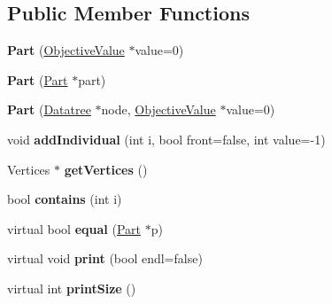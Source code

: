 \subsection*{Public Member Functions}
\begin{DoxyCompactItemize}
\item 
\hypertarget{classPart_a529e3046eef59e036be4a28293e1d696}{{\bfseries Part} (\hyperlink{classObjectiveValue}{Objective\-Value} $\ast$value=0)}\label{classPart_a529e3046eef59e036be4a28293e1d696}

\item 
\hypertarget{classPart_a4fc5eedff4d310041e3ebee54693f4ac}{{\bfseries Part} (\hyperlink{classPart}{Part} $\ast$part)}\label{classPart_a4fc5eedff4d310041e3ebee54693f4ac}

\item 
\hypertarget{classPart_abbe62c3accdcc1234035cd8149b540f0}{{\bfseries Part} (\hyperlink{classDatatree}{Datatree} $\ast$node, \hyperlink{classObjectiveValue}{Objective\-Value} $\ast$value=0)}\label{classPart_abbe62c3accdcc1234035cd8149b540f0}

\item 
\hypertarget{classPart_a4f5392674db4c546b35c5a87dec8d204}{void {\bfseries add\-Individual} (int i, bool front=false, int value=-\/1)}\label{classPart_a4f5392674db4c546b35c5a87dec8d204}

\item 
\hypertarget{classPart_aa5a500dd200b320ffd3a51868cc79fb0}{Vertices $\ast$ {\bfseries get\-Vertices} ()}\label{classPart_aa5a500dd200b320ffd3a51868cc79fb0}

\item 
\hypertarget{classPart_aad63cc5e3df656d4b847a6ad948dbf3d}{bool {\bfseries contains} (int i)}\label{classPart_aad63cc5e3df656d4b847a6ad948dbf3d}

\item 
\hypertarget{classPart_a8b37a2433f60fba0c5dcce393e4f5a86}{virtual bool {\bfseries equal} (\hyperlink{classPart}{Part} $\ast$p)}\label{classPart_a8b37a2433f60fba0c5dcce393e4f5a86}

\item 
\hypertarget{classPart_a2d3c13012c781d8651b820e60d57c724}{virtual void {\bfseries print} (bool endl=false)}\label{classPart_a2d3c13012c781d8651b820e60d57c724}

\item 
\hypertarget{classPart_a501f9fdbc4efd9ce00e1eef4a07f033e}{virtual int {\bfseries print\-Size} ()}\label{classPart_a501f9fdbc4efd9ce00e1eef4a07f033e}

\end{DoxyCompactItemize}
